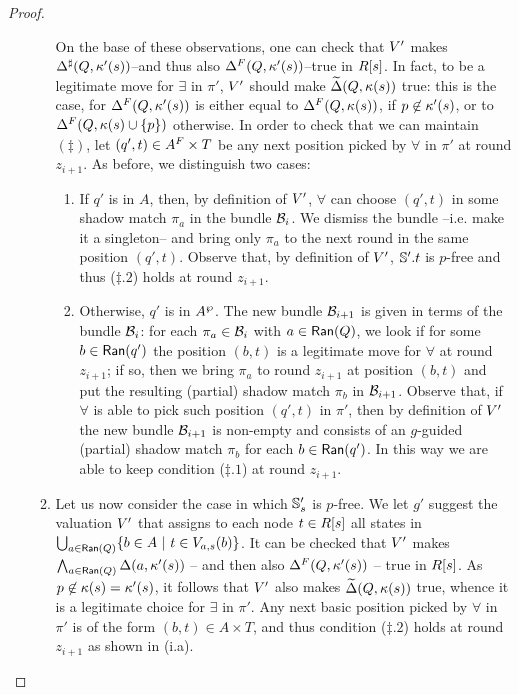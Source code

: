 \begin{proof}
\begin{enumerate}[label = (\Alph*), ref = \Alph*]
\begin{enumerate}[label = (\roman*), ref = \roman*]
       On the base of these observations, one can check that $V'$ makes $\Delta^{\sharp}(Q,\kappa'(s))$--and thus also $\Delta^{F}(Q,\kappa'(s))$--true in $R[s]$. In fact, to be a legitimate move for $\exists$ in $\pi'$, $V'$ should make $\widetilde{\Delta}(Q,\kappa(s))$ true: this is the case, for $\Delta^{F}(Q,\kappa'(s))$ is either equal to $\Delta^{F}(Q,\kappa(s))$, if $p \not\in \kappa'(s)$, or to $\Delta^{F}(Q,\kappa(s)\cup\{p\})$ otherwise. In order to check that we can maintain $(\ddag)$, let $(q',t) \in A^{F} \times T$ be any next position picked by $\forall$ in $\pi'$ at round $z_{i+1}$. As before, we distinguish two cases:
       \begin{enumerate}[label = (\alph*), ref = \alph*]
         \item If $q'$ is in $A$, then, by definition of $V'$, $\forall$ can choose $(q',t)$ in some shadow match $\pi_a$ in the bundle $\mathcal{B}_i$. We dismiss the bundle --i.e. make it a singleton-- and bring only $\pi_a$ to the next round in the same position $(q',t)$. Observe that, by definition of $V'$, $\mathbb{S}'.t$ is $p$-free and thus ($\ddag.2$) holds at round $z_{i+1}$. \label{point:ddag2CardfromMacro}
         \item Otherwise, $q'$ is in $A^{\wp}$. The new bundle $\mathcal{B}_{i+1}$ is given in terms of the bundle $\mathcal{B}_i$: for each $\pi_a \in \mathcal{B}_i$ with $a\in \mathsf{Ran}(Q)$, we look if for some $b \in \mathsf{Ran}(q')$ the position $(b,t)$ is a legitimate move for $\forall$ at round $z_{i+1}$; if so, then we bring $\pi_a$ to round $z_{i+1}$ at position $(b,t)$ and put the resulting (partial) shadow match $\pi_b$ in $\mathcal{B}_{i+1}$. Observe that, if $\forall$ is able to pick such position $(q',t)$ in $\pi'$, then by definition of $V'$ the new bundle $\mathcal{B}_{i+1}$ is non-empty and consists of an $g$-guided (partial) shadow match $\pi_b$ for each $b \in \mathsf{Ran}(q')$. In this way we are able to keep condition ($\ddag.1$) at round $z_{i+1}$.
       \end{enumerate}
    \item Let us now consider the case in which $\mathbb{S}'_s$ is $p$-free. We let $g'$ suggest the valuation $V'$ that assigns to each node $t \in R[s]$ all states in $\bigcup_{a \in \Ran(Q)}\{b \in A\ |\ t \in \val_{a,s}(b)\}$. It can be checked that $V'$ makes $\bigwedge_{a \in \mathsf{Ran}(Q)} \Delta(a,\kappa'(s))$ -- and then also $\Delta^{F}(Q,\kappa'(s))$ -- true in $R[s]$. As $p \not\in \kappa(s)=\kappa'(s)$, it follows that $V'$ also makes $\widetilde{\Delta}(Q,\kappa(s))$ true, whence it is a legitimate choice for $\exists$ in $\pi'$. Any next basic position picked by $\forall$ in $\pi'$ is of the form $(b,t) \in A \times T$, and thus condition ($\ddag.2$) holds at round $z_{i+1}$ as shown in (i.a). %

\end{enumerate}
\end{enumerate}
\end{proof}
